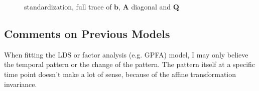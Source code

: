 \documentclass[]{article}
\begin{document}
\begin{figure}[h!]
	\caption{standardization, full trace of $\bm{b}$, $\bm{A}$ diagonal and $\bm{Q}$}
	\label{full trace, std, dynamics}
\end{figure}







\subsection{Comments on Previous Models}
When fitting the LDS or factor analysis (e.g. GPFA) model, I may only believe the temporal pattern or the change of the pattern. The pattern itself at a specific time point doesn't make a lot of sense, because of the affine transformation invariance.
\end{document}
